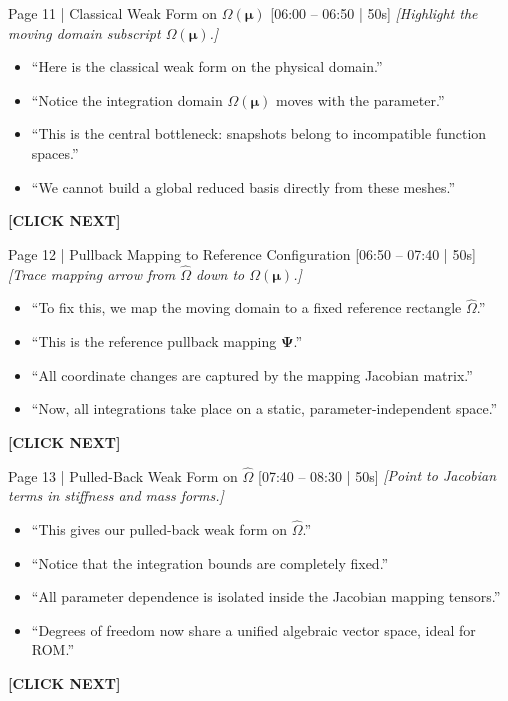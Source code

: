 \documentclass[9pt,a4paper]{article}
\begin{document}
\begin{slidebox}{Page 11 | Classical Weak Form on $\Omega(\boldsymbol{\mu})$ \hfill [06:00 -- 06:50 | 50s]}
\textit{[Highlight the moving domain subscript $\Omega(\boldsymbol{\mu})$.]}
\begin{itemize}
  \item ``Here is the classical weak form on the physical domain.''
  \item ``Notice the integration domain $\Omega(\boldsymbol{\mu})$ moves with the parameter.''
  \item ``This is the central bottleneck: snapshots belong to incompatible function spaces.''
  \item ``We cannot build a global reduced basis directly from these meshes.''
\end{itemize}
\textbf{\color{cnamred}[CLICK NEXT]}
\end{slidebox}

\begin{slidebox}{Page 12 | Pullback Mapping to Reference Configuration \hfill [06:50 -- 07:40 | 50s]}
\textit{[Trace mapping arrow from $\hat{\Omega}$ down to $\Omega(\boldsymbol{\mu})$.]}
\begin{itemize}
  \item ``To fix this, we map the moving domain to a fixed reference rectangle $\hat{\Omega}$.''
  \item ``This is the reference pullback mapping $\boldsymbol{\Psi}$.''
  \item ``All coordinate changes are captured by the mapping Jacobian matrix.''
  \item ``Now, all integrations take place on a static, parameter-independent space.''
\end{itemize}
\textbf{\color{cnamred}[CLICK NEXT]}
\end{slidebox}

\begin{slidebox}{Page 13 | Pulled-Back Weak Form on $\hat{\Omega}$ \hfill [07:40 -- 08:30 | 50s]}
\textit{[Point to Jacobian terms in stiffness and mass forms.]}
\begin{itemize}
  \item ``This gives our pulled-back weak form on $\hat{\Omega}$.''
  \item ``Notice that the integration bounds are completely fixed.''
  \item ``All parameter dependence is isolated inside the Jacobian mapping tensors.''
  \item ``Degrees of freedom now share a unified algebraic vector space, ideal for ROM.''
\end{itemize}
\textbf{\color{cnamred}[CLICK NEXT]}
\end{slidebox}
\end{document}
